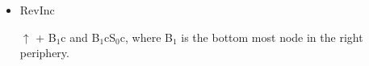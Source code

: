 \documentclass[10pt,usepdftitle=false,hyperref={unicode}]{beamer}
\begin{document}
\begin{frame}
\begin{itemize}
\begin{center}
\begin{table}
\begin{tabularx}{0.95\textwidth}{C{10pt}R{250pt}}
                        S${}_0$cQ${}_0$pQ${}_1$p,
                        S${}_0$pQ${}_0$pQ${}_1$p,
                        S${}_0$wcS${}_1$cS${}_2$c,
                        S${}_0$cS${}_1$wcS${}_2$c,
                        S${}_0$cS${}_1$cS${}_2$wc,
                        S${}_0$cS${}_1$cS${}_2$,
                        S${}_0$pS${}_1$pS${}_2$, \\
                         & S${}_0$cS${}_0$HcS${}_0$Lc,
                        S${}_0$cS${}_0$HcS${}_0$Rc,
                        S${}_1$cS${}_1$HcS${}_1$Rc,
                        S${}_0$cS${}_0$RcQ${}_0$p,
                        S${}_0$cS${}_0$RcQ${}_0$w,
                        S${}_0$cS${}_0$LcS${}_1$c,
                        S${}_0$cS${}_0$LcS${}_1$w,
                        S${}_0$cS${}_1$cS${}_1$Rc,
                        S${}_0$wS${}_1$cS${}_1$Rc, \\
                        \bottomrule
                    \end{tabularx}
                \end{table}
            \end{center}

            \bigskip

        \item RevInc

            $\uparrow$ + B${}_1$c and B${}_1$cS${}_0$c, where B${}_1$ is the bottom most node in the right periphery.
    \end{itemize}
    \endgroup
\end{frame}
\end{document}
